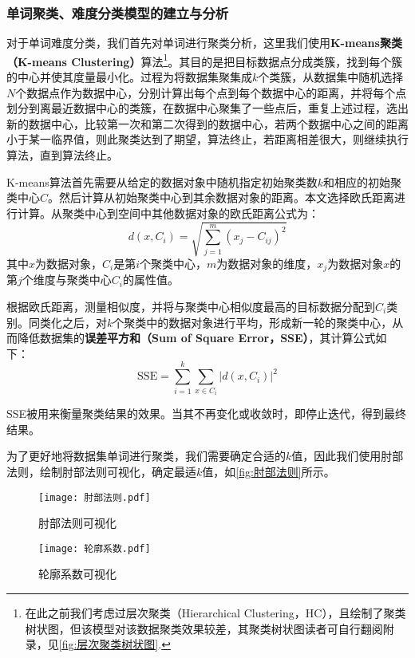 \documentclass{MathModeling}
\begin{document}
	\subsubsection{单词聚类、难度分类模型的建立与分析}
	对于单词难度分类，我们首先对单词进行聚类分析，这里我们使用\textbf{K-means聚类（K-means Clustering）}算法\textcolor{blue}{\footnote{在此之前我们考虑过层次聚类（Hierarchical Clustering，HC），且绘制了聚类树状图，但该模型对该数据聚类效果较差，其聚类树状图读者可自行翻阅附录，见\textcolor{blue}{\cref{fig:层次聚类树状图}}.}}。其目的是把目标数据点分成类簇，找到每个簇的中心并使其度量最小化。过程为将数据集聚集成$k$个类簇，从数据集中随机选择$N$个数据点作为数据中心，分别计算出每个点到每个数据中心的距离，并将每个点划分到离最近数据中心的类簇，在数据中心聚集了一些点后，重复上述过程，选出新的数据中心，比较第一次和第二次得到的数据中心，若两个数据中心之间的距离小于某一临界值，则此聚类达到了期望，算法终止，若距离相差很大，则继续执行算法，直到算法终止。
	
	K-means算法首先需要从给定的数据对象中随机指定初始聚类数$k$和相应的初始聚类中心$C$。然后计算从初始聚类中心到其余数据对象的距离。本文选择欧氏距离进行计算。从聚类中心到空间中其他数据对象的欧氏距离公式为：
	\begin{equation}
		d\left(x,C_i\right)=\sqrt{\sum_{j=1}^{m}(x_{j}-C_{ij})^2}
	\end{equation}
	其中$x$为数据对象，$C_i$是第$i$个聚类中心，$m$为数据对象的维度，$x_j$为数据对象$x$的第$j$个维度与聚类中心$C_i$的属性值。

	根据欧氏距离，测量相似度，并将与聚类中心相似度最高的目标数据分配到$C_i$类别。同类化之后，对$k$个聚类中的数据对象进行平均，形成新一轮的聚类中心，从而降低数据集的\textbf{误差平方和（Sum of Square Error，SSE）}，其计算公式如下：
	\begin{equation}
		\text{SSE}=\sum_{i=1}^{k}\sum_{x\in C_i}\left|d\left(x,C_i\right)\right|^2
	\end{equation}

	SSE被用来衡量聚类结果的效果。当其不再变化或收敛时，即停止迭代，得到最终结果。

	为了更好地将数据集单词进行聚类，我们需要确定合适的$k$值，因此我们使用肘部法则，绘制肘部法则可视化，确定最适$k$值，如\textcolor{blue}{\cref{fig:肘部法则}}所示。

	\begin{figure}[H]
		\centering
		\begin{minipage}{0.48\linewidth}
			\centering
			\texttt{[image: 肘部法则.pdf]}
			\caption{肘部法则可视化}
			\label{fig:肘部法则}
		\end{minipage}
		\begin{minipage}{0.48\linewidth}
			\centering
			\texttt{[image: 轮廓系数.pdf]}
			\caption{轮廓系数可视化}
			\label{fig:轮廓系数}
		\end{minipage}
	\end{figure}
\end{document}
